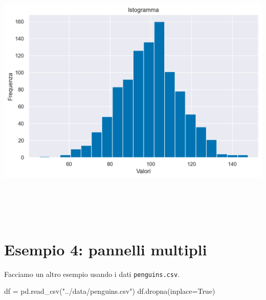 \documentclass[
  letterpaper,
  krantz2]{{[}./krantz{]}}
\newenvironment{Shaded}{\begin{snugshade}}{\end{snugshade}}
\newcommand{\NormalTok}[1]{\textcolor[rgb]{0.00,0.23,0.31}{#1}}
\newcommand{\OperatorTok}[1]{\textcolor[rgb]{0.37,0.37,0.37}{#1}}
\newcommand{\StringTok}[1]{\textcolor[rgb]{0.13,0.47,0.30}{#1}}
\newcommand{\VariableTok}[1]{\textcolor[rgb]{0.07,0.07,0.07}{#1}}
\begin{document}
\includegraphics[width=7.61458in,height=5.11458in]{chapters/python/07_matplotlib_files/figure-pdf/cell-6-output-1.png}

\section{Esempio 4: pannelli
multipli}\label{esempio-4-pannelli-multipli}

Facciamo un altro esempio usando i dati \texttt{penguins.csv}.

\begin{Shaded}
\begin{Highlighting}[]
\NormalTok{df }\OperatorTok{=}\NormalTok{ pd.read\_csv(}\StringTok{"../data/penguins.csv"}\NormalTok{)}
\NormalTok{df.dropna(inplace}\OperatorTok{=}\VariableTok{True}\NormalTok{)}
\end{Highlighting}
\end{Shaded}
\end{document}
